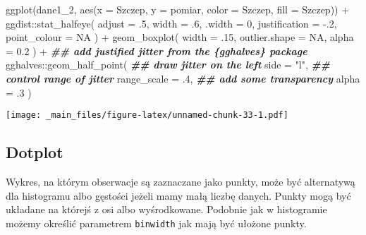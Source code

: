 \documentclass[
]{book}
\newenvironment{Shaded}{\begin{snugshade}}{\end{snugshade}}
\newcommand{\AttributeTok}[1]{\textcolor[rgb]{0.77,0.63,0.00}{#1}}
\newcommand{\ConstantTok}[1]{\textcolor[rgb]{0.00,0.00,0.00}{#1}}
\newcommand{\DecValTok}[1]{\textcolor[rgb]{0.00,0.00,0.81}{#1}}
\newcommand{\DocumentationTok}[1]{\textcolor[rgb]{0.56,0.35,0.01}{\textbf{\textit{#1}}}}
\newcommand{\FloatTok}[1]{\textcolor[rgb]{0.00,0.00,0.81}{#1}}
\newcommand{\FunctionTok}[1]{\textcolor[rgb]{0.00,0.00,0.00}{#1}}
\newcommand{\NormalTok}[1]{#1}
\newcommand{\SpecialCharTok}[1]{\textcolor[rgb]{0.00,0.00,0.00}{#1}}
\newcommand{\StringTok}[1]{\textcolor[rgb]{0.31,0.60,0.02}{#1}}
\begin{document}
\begin{Shaded}
\begin{Highlighting}[]
\FunctionTok{ggplot}\NormalTok{(dane1\_2, }\FunctionTok{aes}\NormalTok{(}\AttributeTok{x =}\NormalTok{ Szczep, }\AttributeTok{y =}\NormalTok{ pomiar, }\AttributeTok{color =}\NormalTok{ Szczep, }\AttributeTok{fill =}\NormalTok{ Szczep)) }\SpecialCharTok{+} 
\NormalTok{  ggdist}\SpecialCharTok{::}\FunctionTok{stat\_halfeye}\NormalTok{(}
    \AttributeTok{adjust =}\NormalTok{ .}\DecValTok{5}\NormalTok{, }
    \AttributeTok{width =}\NormalTok{ .}\DecValTok{6}\NormalTok{, }
    \AttributeTok{.width =} \DecValTok{0}\NormalTok{, }
    \AttributeTok{justification =} \SpecialCharTok{{-}}\NormalTok{.}\DecValTok{2}\NormalTok{, }
    \AttributeTok{point\_colour =} \ConstantTok{NA}
\NormalTok{  ) }\SpecialCharTok{+} 
  \FunctionTok{geom\_boxplot}\NormalTok{(}
    \AttributeTok{width =}\NormalTok{ .}\DecValTok{15}\NormalTok{, }
    \AttributeTok{outlier.shape =} \ConstantTok{NA}\NormalTok{,}
    \AttributeTok{alpha =} \FloatTok{0.2}
\NormalTok{  ) }\SpecialCharTok{+}
  \DocumentationTok{\#\# add justified jitter from the \{gghalves\} package}
\NormalTok{  gghalves}\SpecialCharTok{::}\FunctionTok{geom\_half\_point}\NormalTok{(}
    \DocumentationTok{\#\# draw jitter on the left}
    \AttributeTok{side =} \StringTok{"l"}\NormalTok{, }
    \DocumentationTok{\#\# control range of jitter}
    \AttributeTok{range\_scale =}\NormalTok{ .}\DecValTok{4}\NormalTok{, }
    \DocumentationTok{\#\# add some transparency}
    \AttributeTok{alpha =}\NormalTok{ .}\DecValTok{3}
\NormalTok{  ) }
\end{Highlighting}
\end{Shaded}

\texttt{[image: \_main\_files/figure-latex/unnamed-chunk-33-1.pdf]}

\hypertarget{dotplot}{%
\subsection{Dotplot}\label{dotplot}}

Wykres, na którym obserwacje są zaznaczane jako punkty, może być alternatywą dla histogramu albo gęstości jeżeli mamy małą liczbę danych. Punkty mogą być układane na którejś z osi albo wyśrodkowane. Podobnie jak w histogramie możemy określić parametrem \texttt{binwidth} jak mają być ułożone punkty.
\end{document}
